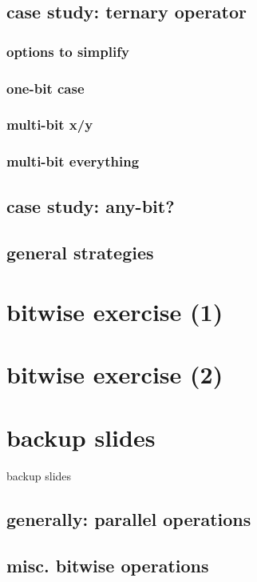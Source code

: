 

\subsection{case study: ternary operator}


\subsubsection{options to simplify}


\subsubsection{one-bit case}


\subsubsection{multi-bit x/y}


\subsubsection{multi-bit everything}



\subsection{case study: any-bit?}



\subsection{general strategies}



\section{bitwise exercise (1)}


\section{bitwise exercise (2)}


\section{backup slides}
\begin{frame}{backup slides}
\end{frame}

\subsection{generally: parallel operations}


\subsection{misc. bitwise operations}



